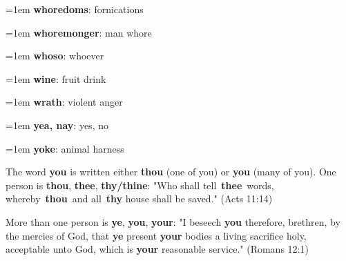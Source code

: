 {\begin{multicols}{3}
{\hangindent=1em \textbf{whoredoms}: fornications\par
\hangindent=1em \textbf{whoremonger}: man whore\par
\hangindent=1em \textbf{whoso}: whoever\par
\hangindent=1em \textbf{wine}: fruit drink\par
\hangindent=1em \textbf{wrath}: violent anger\par
\hangindent=1em \textbf{yea, nay}: yes, no\par
\hangindent=1em \textbf{yoke}: animal harness\par
}\end{multicols}
\setlength{\parindent}{1em}
\par
The word \textbf{you} is written either \textbf{thou} (one of you) or \textbf{you} (many of you).
One person is \textbf{thou}, \textbf{thee}, \textbf{thy/thine}:
"Who shall tell \textbf{thee} words, whereby \textbf{thou} and all \textbf{thy} house shall be saved."
(Acts 11:14)
\par
More than one person is \textbf{ye}, \textbf{you}, \textbf{your}:
"I beseech \textbf{you} therefore, brethren, by the mercies of God, that \textbf{ye} present
\textbf{your} bodies a living sacrifice holy, acceptable unto God, which is \textbf{your}
reasonable service." (Romans 12:1)
}

